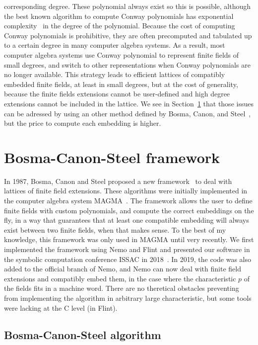corresponding degree. These polynomial always exist so this is possible,
although the best known algorithm to compute Conway polynomials has exponential
complexity~\cite{HL98} in the degree of the polynomial. Because the cost of
computing Conway polynomials is
prohibitive, they are often precomputed and tabulated up to a certain degree in
many computer algebra systems. As a result, most computer algebra systems use
Conway polynomial to represent finite fields of small degrees, and switch to
other representations when Conway polynomials are no longer available. This
strategy leads to efficient lattices of compatibly embedded finite fields, at
least in small degrees, but at the cost of generality, because the finite fields
extensions cannot be user-defined and high degree extensions cannot be included
in the lattice. We see in Section~\ref{sec:bosma-canon-steel} that those issues
can be adressed by using an other method 
defined by Bosma, Canon, and Steel~\cite{BCS97}, but the price to compute each
embedding is higher.

\section{Bosma-Canon-Steel framework}
\label{sec:bosma-canon-steel}

In 1987, Bosma, Canon and Steel proposed a new framework~\cite{BCS97} to deal
with lattices of finite field extensions. These algorithms were initially
implemented in the computer algebra system MAGMA~\cite{Magma}. The framework allows the user
to define finite fields with custom polynomials, and compute the
correct embeddings on the fly, in a way that guarantees that at least one
compatible embedding will always exist between two finite fields, when that
makes sense. To the best of my knowledge, this framework was only used in MAGMA
until very recently. We first implemented the framework using Nemo and Flint and
presented our software in the symbolic computation conference ISSAC in
2018~\cite{DRR18}. In 2019, the code was also added to the official branch of
Nemo, and Nemo can now deal with finite field extensions and compatibly embed
them, in the case where the characteristic $p$ of the fields fits in a machine
word. There are no theretical obstacles preventing from implementing the algorithm in arbitrary
large characteristic, but some tools were lacking at the C level (\ie in
Flint).

\subsection{Bosma-Canon-Steel algorithm}
